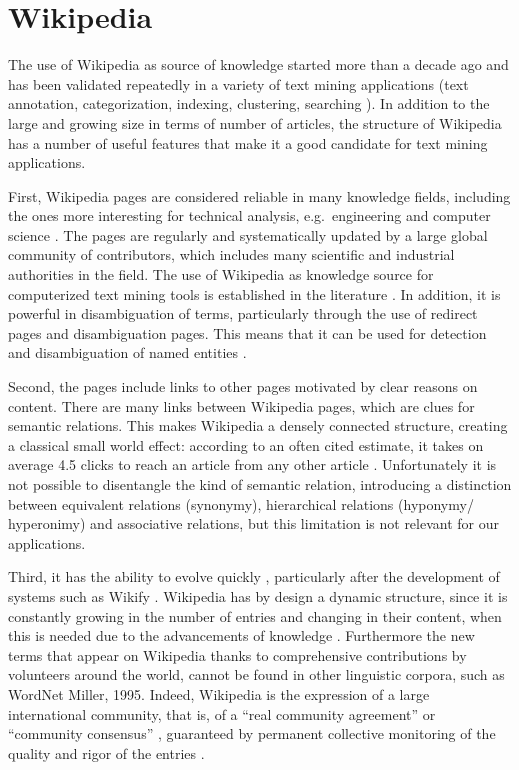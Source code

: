 \documentclass[b5paper,]{book}
\theoremstyle{definition}
\theoremstyle{definition}
\theoremstyle{definition}
\theoremstyle{remark}
\begin{document}
\section{Wikipedia}\label{sotadocumentswiki}

The use of Wikipedia as source of knowledge started more than a decade
ago and has been validated repeatedly in a variety of text mining
applications (text annotation, categorization, indexing, clustering,
searching \citep{milne2008learning}). In addition to the large and
growing size in terms of number of articles, the structure of Wikipedia
has a number of useful features that make it a good candidate for text
mining applications.

First, Wikipedia pages are considered reliable in many knowledge fields,
including the ones more interesting for technical analysis,
e.g.~engineering and computer science \citep{xu2015improving}. The pages
are regularly and systematically updated by a large global community of
contributors, which includes many scientific and industrial authorities
in the field. The use of Wikipedia as knowledge source for computerized
text mining tools is established in the literature
\citep{ferragina2012fast}. In addition, it is powerful in disambiguation
of terms, particularly through the use of redirect pages and
disambiguation pages. This means that it can be used for detection and
disambiguation of named entities \citep{bunescu2006using}.

Second, the pages include links to other pages motivated by clear
reasons on content. There are many links between Wikipedia pages, which
are clues for semantic relations. This makes Wikipedia a densely
connected structure, creating a classical small world effect: according
to an often cited estimate, it takes on average 4.5 clicks to reach an
article from any other article \citep{dolan2008six}. Unfortunately it is
not possible to disentangle the kind of semantic relation, introducing a
distinction between equivalent relations (synonymy), hierarchical
relations (hyponymy/ hyperonimy) and associative relations, but this
limitation is not relevant for our applications.

Third, it has the ability to evolve quickly \citep{lih2004wikipedia},
particularly after the development of systems such as Wikify
\citep{mihalcea2007wikify, cheng2013relational}. Wikipedia has by design
a dynamic structure, since it is constantly growing in the number of
entries and changing in their content, when this is needed due to the
advancements of knowledge \citep{ponzetto2007knowledge}. Furthermore the
new terms that appear on Wikipedia thanks to comprehensive contributions
by volunteers around the world, cannot be found in other linguistic
corpora, such as WordNet Miller, 1995. Indeed, Wikipedia is the
expression of a large international community, that is, of a ``real
community agreement'' \citep{bizer2009dbpedia} or ``community
consensus'' \citep{hepp2007harvesting}, guaranteed by permanent
collective monitoring of the quality and rigor of the entries
\citep{bryant2005becoming}.
\end{document}
